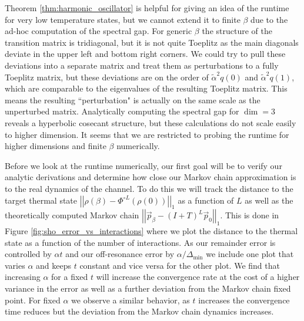 \documentclass{article}
\newcommand{\norm}[1]{\left| \left| #1 \right| \right|}
\begin{document}
Theorem \ref{thm:harmonic_oscillator} is helpful for giving an idea of the runtime for very low temperature states, but we cannot extend it to finite $\beta$ due to the ad-hoc computation of the spectral gap. For generic $\beta$ the structure of the transition matrix is tridiagonal, but it is not quite Toeplitz as the main diagonals deviate in the upper left and bottom right corners. We could try to pull these deviations into a separate matrix and treat them as perturbations to a fully Toeplitz matrix, but these deviations are on the order of $\widetilde{\alpha}^2 q(0)$ and $\widetilde{\alpha}^2 q(1)$, which are comparable to the eigenvalues of the resulting Toeplitz matrix. This means the resulting ``perturbation" is actually on the same scale as the unperturbed matrix. Analytically computing the spectral gap for $\dim = 3$ reveals a hyperbolic cosecant structure, but these calculations do not scale easily to higher dimension. It seems that we are restricted to probing the runtime for higher dimensions and finite $\beta$ numerically.

Before we look at the runtime numerically, our first goal will be to verify our analytic derivations and determine how close our Markov chain approximation is to the real dynamics of the channel. To do this we will track the distance to the target thermal state $\norm{\rho(\beta) - \Phi^{\circ L}(\rho(0))}_1$ as a function of $L$ as well as the theoretically computed Markov chain $\norm{\vec{p}_{\beta} - (I + T)^L \vec{p}_0}_1 $. This is done in Figure \ref{fig:sho_error_vs_interactions} where we plot the distance to the thermal state as a function of the number of interactions. As our remainder error is controlled by $\alpha t$ and our off-resonance error by $\alpha / \Delta_{\min}$ we include one plot that varies $\alpha$ and keeps $t$ constant and vice versa for the other plot. We find that increasing $\alpha$ for a fixed $t$ will increase the convergence rate at the cost of a higher variance in the error as well as a further deviation from the Markov chain fixed point. For fixed $\alpha$ we observe a similar behavior, as $t$ increases the convergence time reduces but the deviation from the Markov chain dynamics increases.
\end{document}

